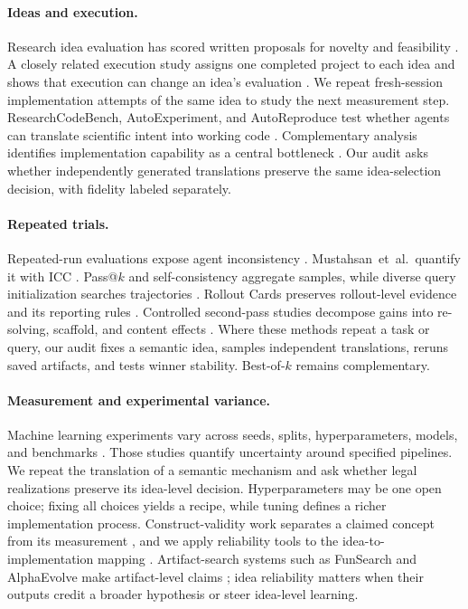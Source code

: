 \documentclass[letterpaper]{article}
\begin{document}
\paragraph{Ideas and execution.} Research idea evaluation has scored written proposals for novelty and feasibility \cite{si2025ideas}. A closely related execution study assigns one completed project to each idea and shows that execution can change an idea's evaluation \cite{si2026gap}. We repeat fresh-session implementation attempts of the same idea to study the next measurement step. ResearchCodeBench, AutoExperiment, and AutoReproduce test whether agents can translate scientific intent into working code \cite{hua2025researchcodebench,kim2026autoexperiment,zhao2025autoreproduce}. Complementary analysis identifies implementation capability as a central bottleneck \cite{zhu2025implementation}. Our audit asks whether independently generated translations preserve the same idea-selection decision, with fidelity labeled separately.

\paragraph{Repeated trials.} Repeated-run evaluations expose agent inconsistency \cite{rabanser2026reliability,mehta2026disagree}. \mbox{Mustahsan et al.}\ quantify it with ICC \cite{mustahsan2025icc}. Pass@$k$ and self-consistency aggregate samples, while diverse query initialization searches trajectories \cite{chen2021codex,wang2023selfconsistency,murali2026divinit}. Rollout Cards preserves rollout-level evidence and its reporting rules \cite{masters2026rolloutcards}. Controlled second-pass studies decompose gains into re-solving, scaffold, and content effects \cite{ning2026revision}. Where these methods repeat a task or query, our audit fixes a semantic idea, samples independent translations, reruns saved artifacts, and tests winner stability. Best-of-$k$ remains complementary.

\paragraph{Measurement and experimental variance.} Machine learning experiments vary across seeds, splits, hyperparameters, models, and benchmarks \cite{henderson2018matters,bouthillier2021variance,agarwal2021precipice,wortsman2022modelsoups,dehghani2021benchmarklottery,liang2023helm,pineau2021reproducibility}. Those studies quantify uncertainty around specified pipelines. We repeat the translation of a semantic mechanism and ask whether legal realizations preserve its idea-level decision. Hyperparameters may be one open choice; fixing all choices yields a recipe, while tuning defines a richer implementation process. Construct-validity work separates a claimed concept from its measurement \cite{jacobs2021measurement,bean2025construct}, and we apply reliability tools to the idea-to-implementation mapping \cite{shrout1979icc,brennan2001generalizability}. Artifact-search systems such as FunSearch and AlphaEvolve make artifact-level claims \cite{romera2024funsearch,novikov2025alphaevolve}; idea reliability matters when their outputs credit a broader hypothesis or steer idea-level learning.
\end{document}
